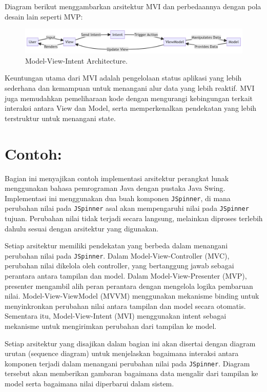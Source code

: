 Diagram berikut menggambarkan arsitektur MVI dan perbedaannya dengan pola desain lain seperti MVP:

\begin{figure}[h]
	\centering
	\includegraphics[width=\textwidth]{../images/mvi.png}
	\caption{Model-View-Intent Architecture.}
	\label{fig:mvi-architecture}
\end{figure}

Keuntungan utama dari MVI adalah pengelolaan status aplikasi yang lebih sederhana dan kemampuan untuk menangani alur data yang lebih reaktif. MVI juga memudahkan pemeliharaan kode dengan mengurangi kebingungan terkait interaksi antara View dan Model, serta memperkenalkan pendekatan yang lebih terstruktur untuk menangani state.


\section{Contoh:}

Bagian ini menyajikan contoh implementasi arsitektur perangkat lunak menggunakan bahasa pemrograman Java dengan pustaka Java Swing. Implementasi ini menggunakan dua buah komponen \texttt{JSpinner}, di mana perubahan nilai pada \texttt{JSpinner} asal akan mempengaruhi nilai pada \texttt{JSpinner} tujuan. Perubahan nilai tidak terjadi secara langsung, melainkan diproses terlebih dahulu sesuai dengan arsitektur yang digunakan.

Setiap arsitektur memiliki pendekatan yang berbeda dalam menangani perubahan nilai pada \texttt{JSpinner}. Dalam Model-View-Controller (MVC), perubahan nilai dikelola oleh controller, yang bertanggung jawab sebagai perantara antara tampilan dan model. Dalam Model-View-Presenter (MVP), presenter mengambil alih peran perantara dengan mengelola logika pembaruan nilai. Model-View-ViewModel (MVVM) menggunakan mekanisme binding untuk menyinkronkan perubahan nilai antara tampilan dan model secara otomatis. Sementara itu, Model-View-Intent (MVI) menggunakan intent sebagai mekanisme untuk mengirimkan perubahan dari tampilan ke model.

Setiap arsitektur yang disajikan dalam bagian ini akan disertai dengan diagram urutan (sequence diagram) untuk menjelaskan bagaimana interaksi antara komponen terjadi dalam menangani perubahan nilai pada \texttt{JSpinner}. Diagram tersebut akan memberikan gambaran bagaimana data mengalir dari tampilan ke model serta bagaimana nilai diperbarui dalam sistem.


